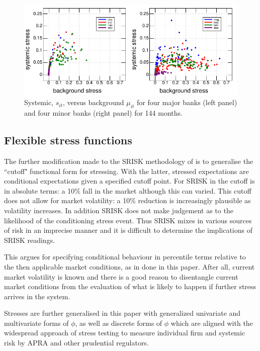 \documentclass[authoryear]{elsarticle}
\begin{document}
\begin{figure}[htbp]
\begin{center}
\includegraphics{figures/sysstress.pdf}
\caption{Systemic, $s_{it}$, versus background $\mu_{it}$   for four major banks (left panel) and four minor banks (right panel)  for 144 months.}
\label{sysstress}
\end{center}
\end{figure}


\subsection{Flexible  stress  functions}

The further modification made to the SRISK methodology of \cite{brownlees2015} is to generalise the ``cutoff" functional form for stressing.   With the latter, stressed expectations are conditional expectations given a specified cutoff point.  For SRISK in \cite{brownlees2015} the cutoff is in absolute terms:  a 10\% fall in the market although this can varied.   This cutoff does not allow for market volatility:   a 10\% reduction is  increasingly plausible as volatility increases.  In addition  SRISK does not  make judgement as to the likelihood of the conditioning stress event.   Thus SRISK mixes in various  sources of risk in an imprecise manner and it is difficult to determine the implications of SRISK readings.

This argues for specifying conditional behaviour in percentile terms relative to the then applicable market conditions, as in done in this paper.  After all, current market volatility is known and there is a good reason to disentangle current market conditions from the evaluation of what is likely to happen if further stress arrives in the system.

Stresses are further generalised in this paper with generalized univariate and multivariate forms of $\phi$, as well as discrete forms of $\phi$ which are aligned with the widespread approach of stress testing to measure individual firm and systemic risk by APRA and other prudential regulators.
\end{document}
